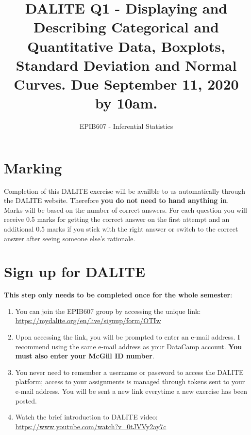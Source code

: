 \documentclass[letterpaper,12pt,twoside,]{pinp}
\title{DALITE Q1 - Displaying and Describing Categorical and Quantitative Data,
Boxplots, Standard Deviation and Normal Curves. Due September 11, 2020
by 10am.}
\author[a]{EPIB607 - Inferential Statistics}
\affil[a]{Fall 2020, McGill University}
\providecommand{\tightlist}{%
  \setlength{\itemsep}{0pt}\setlength{\parskip}{0pt}}
\begin{document}
\verticaladjustment{-2pt}

\maketitle
\thispagestyle{firststyle}



\hypertarget{marking}{%
\section*{Marking}\label{marking}}

Completion of this DALITE exercise will be availble to us automatically
through the DALITE website. Therefore \textbf{you do not need to hand
anything in}. Marks will be based on the number of correct answers. For
each question you will receive 0.5 marks for getting the correct answer
on the first attempt and an additional 0.5 marks if you stick with the
right answer or switch to the correct answer after seeing someone else's
rationale.

\hypertarget{sign-up-for-dalite}{%
\section{Sign up for DALITE}\label{sign-up-for-dalite}}

\textbf{This step only needs to be completed once for the whole
semester}:

\begin{enumerate}
\def\labelenumi{\arabic{enumi}.}
\tightlist
\item
  You can join the EPIB607 group by accessing the unique link:
  \url{https://mydalite.org/en/live/signup/form/OTIw}
\item
  Upon accessing the link, you will be prompted to enter an e-mail
  address. I recommend using the same e-mail address as your DataCamp
  account. \textbf{You must also enter your McGill ID number}.
\item
  You never need to remember a username or password to access the DALITE
  platform; access to your assignments is managed through tokens sent to
  your e-mail address. You will be sent a new link everytime a new
  exercise has been posted.
\item
  Watch the brief introduction to DALITE video:
  \url{https://www.youtube.com/watch?v=0tJVVy2ay7c}
\end{enumerate}
\end{document}
